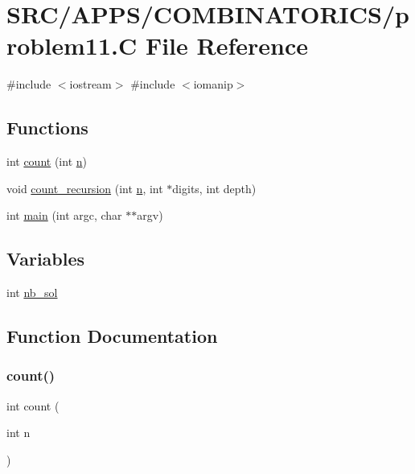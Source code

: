 \hypertarget{problem11_8_c}{}\section{S\+R\+C/\+A\+P\+P\+S/\+C\+O\+M\+B\+I\+N\+A\+T\+O\+R\+I\+C\+S/problem11.C File Reference}
\label{problem11_8_c}
{\ttfamily \#include $<$iostream$>$}\newline
{\ttfamily \#include $<$iomanip$>$}\newline
\subsection*{Functions}
\begin{DoxyCompactItemize}
\item 
int \mbox{\hyperlink{problem11_8_c_aa924f9ef999c8e33f83eb98e56d31784}{count}} (int \mbox{\hyperlink{simeon_8_c_a7f2cd26777ce0ff3fdaf8d02aacbddfb}{n}})
\item 
void \mbox{\hyperlink{problem11_8_c_ad005997745979f6c3f9fa5025786fc43}{count\+\_\+recursion}} (int \mbox{\hyperlink{simeon_8_c_a7f2cd26777ce0ff3fdaf8d02aacbddfb}{n}}, int $\ast$digits, int depth)
\item 
int \mbox{\hyperlink{problem11_8_c_a3c04138a5bfe5d72780bb7e82a18e627}{main}} (int argc, char $\ast$$\ast$argv)
\end{DoxyCompactItemize}
\subsection*{Variables}
\begin{DoxyCompactItemize}
\item 
int \mbox{\hyperlink{problem11_8_c_a8059a1d2e4c33dbffdc8c7cd659a3e4d}{nb\+\_\+sol}}
\end{DoxyCompactItemize}


\subsection{Function Documentation}
\mbox{\label{problem11_8_c_aa924f9ef999c8e33f83eb98e56d31784}} 
\subsubsection{\texorpdfstring{count()}{count()}}
{\footnotesize\ttfamily int count (\begin{DoxyParamCaption}\item[{int}]{n }\end{DoxyParamCaption})}


